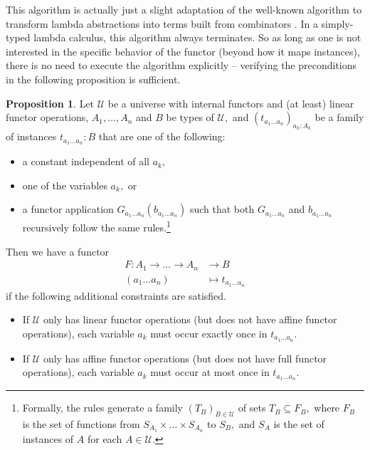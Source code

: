 \documentclass[a4paper]{article}
\theoremstyle{definition}
\newtheorem{proposition}[definition]{Proposition}
\theoremstyle{remark}
\newcommand{\U}{\mathcal{U}}
\begin{document}
This algorithm is actually just a slight adaptation of the well-known algorithm to
transform lambda abstractions into terms built from combinators \cite{combinators}. In a
simply-typed lambda calculus, this algorithm always terminates. So as long as one is
not interested in the specific behavior of the functor (beyond how it maps instances),
there is no need to execute the algorithm explicitly -- verifying the preconditions
in the following proposition is sufficient.

\begin{proposition}
  \label{prp:functoriality}
  Let $\U$ be a universe with internal functors and (at least) linear functor
  operations, $A_1,\ldots,A_n$ and $B$ be types of $\U,$ and
  $(t_{a_1 \ldots a_n})_{a_k : A_k}$ be a family of instances $t_{a_1 \ldots a_n} : B$
  that are one of the following:
  \begin{itemize}
    \item a constant independent of all $a_k,$
    \item one of the variables $a_k,$ or
    \item a functor application $G_{a_1 \ldots a_n}(b_{a_1 \ldots a_n})$ such that
    both $G_{a_1 \ldots a_n}$ and $b_{a_1 \ldots a_n}$ recursively follow the same
    rules.\footnote{Formally, the rules generate a family $(T_B)_{B \in \U}$ of
    sets $T_B \subseteq F_B,$ where $F_B$ is the set of functions from
    $S_{A_1} \times \dots \times S_{A_n}$ to $S_B,$ and $S_A$ is the set of
    instances of $A$ for each $A \in \U.$}
  \end{itemize}
  Then we have a functor
  \begin{align*}
    F : A_1 \to \dots \to A_n &\to     B\\
        (a_1 \ldots a_n)      &\mapsto t_{a_1 \ldots a_n}
  \end{align*}
  if the following additional constraints are satisfied.
  \begin{itemize}
    \item If $\U$ only has linear functor operations (but does not have affine
    functor operations), each variable $a_k$ must occur exactly once in $t_{a_1 \ldots a_n}.$
    \item If $\U$ only has affine functor operations (but does not have full
    functor operations), each variable $a_k$ must occur at most once in $t_{a_1 \ldots a_n}.$
  \end{itemize}
\end{proposition}
\end{document}
